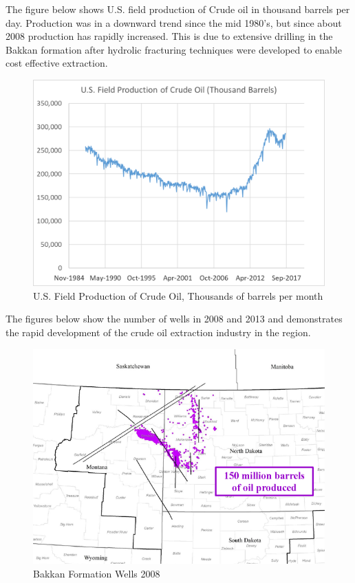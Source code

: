 \documentclass[
  letterpaper,
  DIV=11,
  numbers=noendperiod]{scrreprt}
\begin{document}
The figure below shows U.S. field production of Crude oil in thousand
barrels per day. Production was in a downward trend since the mid
1980's, but since about 2008 production has rapidly increased. This is
due to extensive drilling in the Bakkan formation after hydrolic
fracturing techniques were developed to enable cost effective
extraction.

\begin{figure}

{\centering \includegraphics{Excel-files/CrudeOiland-crudeoil_files/image004.png}

}

\caption{U.S. Field Production of Crude Oil, Thousands of barrels per
month}

\end{figure}

The figures below show the number of wells in 2008 and 2013 and
demonstrates the rapid development of the crude oil extraction industry
in the region.

\begin{figure}

{\centering \includegraphics{images/640px-Bakken_Wells_2008.png}

}

\caption{Bakkan Formation Wells 2008}

\end{figure}
\end{document}
